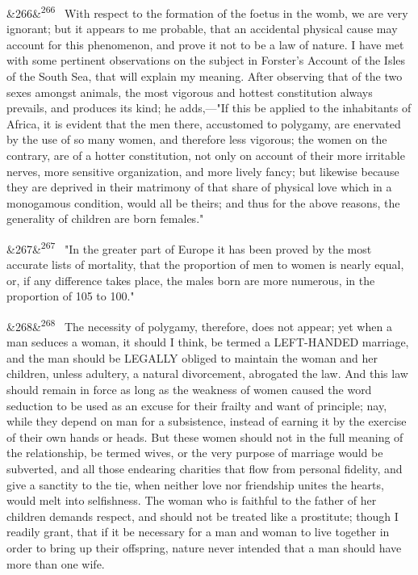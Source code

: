 \documentclass[12pt]{article}
\newcommand{\para}[1][]{\par\noindent\ifx&#1&\else\textsuperscript{\footnotesize #1}~\fi}
\begin{document}
\para[266] With respect to the formation of the foetus in the womb, we are very ignorant; but it appears to me probable, that an accidental physical cause may account for this phenomenon, and prove it not to be a law of nature. I have met with some pertinent observations on the subject in Forster's Account of the Isles of the South Sea, that will explain my meaning. After observing that of the two sexes amongst animals, the most vigorous and hottest constitution always prevails, and produces its kind; he adds,---"If this be applied to the inhabitants of Africa, it is evident that the men there, accustomed to polygamy, are enervated by the use of so many women, and therefore less vigorous; the women on the contrary, are of a hotter constitution, not only on account of their more irritable nerves, more sensitive organization, and more lively fancy; but likewise because they are deprived in their matrimony of that share of physical love which in a monogamous condition, would all be theirs; and thus for the above reasons, the generality of children are born females."

\para[267] "In the greater part of Europe it has been proved by the most accurate lists of mortality, that the proportion of men to women is nearly equal, or, if any difference takes place, the males born are more numerous, in the proportion of 105 to 100."

\para[268] The necessity of polygamy, therefore, does not appear; yet when a man seduces a woman, it should I think, be termed a LEFT-HANDED marriage, and the man should be LEGALLY obliged to maintain the woman and her children, unless adultery, a natural divorcement, abrogated the law. And this law should remain in force as long as the weakness of women caused the word seduction to be used as an excuse for their frailty and want of principle; nay, while they depend on man for a subsistence, instead of earning it by the exercise of their own hands or heads. But these women should not in the full meaning of the relationship, be termed wives, or the very purpose of marriage would be subverted, and all those endearing charities that flow from personal fidelity, and give a sanctity to the tie, when neither love nor friendship unites the hearts, would melt into selfishness. The woman who is faithful to the father of her children demands respect, and should not be treated like a prostitute; though I readily grant, that if it be necessary for a man and woman to live together in order to bring up their offspring, nature never intended that a man should have more than one wife.
\end{document}

